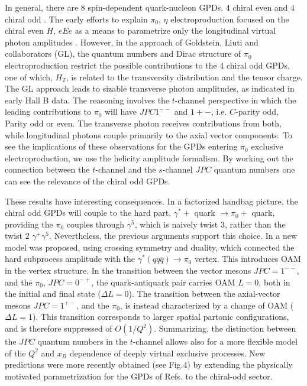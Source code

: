     
    
    \iffalse
    In general, there are 8 spin-dependent quark-nucleon GPDs, 4 chiral even and 4 chiral odd \cite{8}. The early efforts to explain $\pi_0$, $\eta$ electroproduction focused on the chiral even $H$, $e Ee$ as a means to parametrize only the longitudinal virtual photon amplitudes \cite{7}. However, in the approach of Goldstein, Liuti and collaborators \cite{9} (GL), the quantum numbers and Dirac structure of $\pi_0$ electroproduction restrict the possible contributions to the 4 chiral odd GPDs, one of which, $H_T$, is related to the transversity distribution and the tensor charge. The GL approach leads to sizable transverse photon amplitudes, as indicated in early Hall B data. The reasoning involves the $t$-channel perspective in which the leading contributions to $\pi_0$ will have $J P C 1^{-−}$ and $1+−$, i.e. $C$-parity odd, Parity odd or even. The transverse photon receives contributions from both, while longitudinal photons couple primarily to the axial vector components. To see the implications of these observations for the GPDs entering $\pi_0$ exclusive electroproduction, we use the helicity amplitude formalism. By working out the connection between the $t$-channel and the $s$-channel $J P C$ quantum numbers one can see the relevance of the chiral odd GPDs.
    
    These results have interesting consequences. In a factorized handbag picture, the chiral odd GPDs will couple to the hard part, $\gamma^{*} +$ quark $\rightarrow \pi_0 +$ quark, providing the $\pi_0$ couples through $\gamma^5$, which is naively twist 3, rather than the twist 2 $\gamma^+ \gamma^5$. Nevertheless, the previous arguments support this choice. In \cite{9} a new model was proposed, using crossing symmetry and duality, which connected the hard subprocess amplitude with the $\gamma^{*}(qq\overline{q}) \rightarrow \pi_0$ vertex. This introduces OAM in the vertex structure. In the transition between the vector mesons $J P C = 1^{−−}$, and the $\pi_0$, $J P C = 0^{−+}$, the quark-antiquark pair carries OAM $L = 0$, both in the initial and final state ($\Delta L = 0$). The transition between the axial-vector mesons $J P C = 1^{+−}$, and the $\pi_0$, is instead characterized by a change of OAM ($\Delta L = 1$). This transition corresponds to larger spatial partonic configurations, and is therefore suppressed of $O(1/Q^2)$. Summarizing, the distinction between the $J P C$ quantum numbers in the $t$-channel allows also for a more flexible model of the $Q^2$ and $x_B$ dependence of deeply virtual exclusive processes. New predictions were more recently obtained (see Fig.4) by extending the physically motivated parametrization for the GPDs of Refs.\cite{11, 25} to the chiral-odd sector.
    
